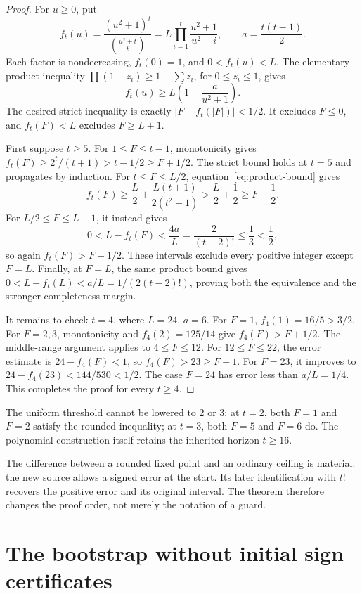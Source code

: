 \documentclass[11pt,letterpaper]{article}
\theoremstyle{remark}\newtheorem{remark}[theorem]{Remark}
\begin{document}
\begin{proof}
For \(u\ge0\), put
\[
 f_t(u)=\frac{(u^2+1)^t}{\binom{u^2+t}{t}}
 =L\prod_{i=1}^t\frac{u^2+1}{u^2+i},
 \qquad a=\frac{t(t-1)}2.
\]
Each factor is nondecreasing, \(f_t(0)=1\), and \(0<f_t(u)<L\).
The elementary product inequality \(\prod(1-z_i)\ge1-\sum z_i\),
for \(0\le z_i\le1\), gives
\begin{equation}\label{eq:product-bound}
 f_t(u)\ge L\left(1-\frac{a}{u^2+1}\right).
\end{equation}
The desired strict inequality is exactly \(|F-f_t(|F|)|<1/2\).
It excludes \(F\le0\), and \(f_t(F)<L\) excludes \(F\ge L+1\).

First suppose \(t\ge5\). For \(1\le F\le t-1\), monotonicity gives
\(f_t(F)\ge2^t/(t+1)>t-1/2\ge F+1/2\).
The strict bound holds at \(t=5\) and propagates by induction.
For \(t\le F\le L/2\), equation~\eqref{eq:product-bound} gives
\[
 f_t(F)\ge\frac L2+\frac{L(t+1)}{2(t^2+1)}
 >\frac L2+\frac12\ge F+\frac12.
\]
For \(L/2\le F\le L-1\), it instead gives
\[
 0<L-f_t(F)<\frac{4a}{L}
 =\frac{2}{(t-2)!}\le\frac13<\frac12,
\]
so again \(f_t(F)>F+1/2\). These intervals exclude every positive
integer except \(F=L\). Finally, at \(F=L\), the same product bound gives
\(0<L-f_t(L)<a/L=1/(2(t-2)!)\), proving both the equivalence and the
stronger completeness margin.

It remains to check \(t=4\), where \(L=24\), \(a=6\).
For \(F=1\), \(f_4(1)=16/5>3/2\). For \(F=2,3\), monotonicity and
\(f_4(2)=125/14\) give \(f_4(F)>F+1/2\).
The middle-range argument applies to \(4\le F\le12\).
For \(12\le F\le22\), the error estimate is \(24-f_4(F)<1\),
so \(f_4(F)>23\ge F+1\). For \(F=23\), it improves to
\(24-f_4(23)<144/530<1/2\). The case \(F=24\) has error less than
\(a/L=1/4\). This completes the proof for every \(t\ge4\).
\end{proof}

The uniform threshold cannot be lowered to 2 or 3: at \(t=2\), both
\(F=1\) and \(F=2\) satisfy the rounded inequality; at \(t=3\), both
\(F=5\) and \(F=6\) do. The polynomial construction itself retains
the inherited horizon \(t\ge16\).

The difference between a rounded fixed point and an ordinary ceiling is
material: the new source allows a signed error at the start. Its later
identification with \(t!\) recovers the positive error and its original
interval. The theorem therefore changes the proof order, not merely the
notation of a guard.

\section{The bootstrap without initial sign certificates}\label{sec:signed}
\end{document}
